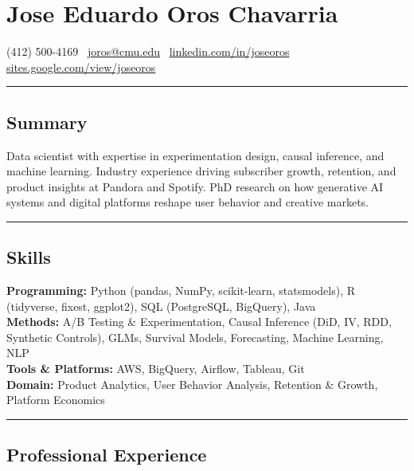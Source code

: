 \documentclass[10pt,letterpaper]{article}
\newcommand{\name}[1]{\section*{#1}}
\newcommand{\sep}{{\color{gray}\,\textbullet\,\,}}
\newcommand{\hsep}{\noindent\textcolor{gray}{\rule{\textwidth}{0.5pt}}}
\newcommand{\block}[1]{\begin{samepage}\hsep\subsection*{#1}\end{samepage}}
\begin{document}
\name{Jose Eduardo Oros Chavarria}

\begin{center}
(412) 500-4169 \sep \href{mailto:joros@cmu.edu}{joros@cmu.edu} \sep \href{https://www.linkedin.com/in/joseoros}{linkedin.com/in/joseoros} \sep \href{https://sites.google.com/view/joseoros}{sites.google.com/view/joseoros}
\end{center}

\block{Summary}

\noindent Data scientist with expertise in experimentation design, causal inference, and machine learning. Industry experience driving subscriber growth, retention, and product insights at Pandora and Spotify. PhD research on how generative AI systems and digital platforms reshape user behavior and creative markets.

\block{Skills}

\noindent\textbf{Programming:} Python (pandas, NumPy, scikit-learn, statsmodels), R (tidyverse, fixest, ggplot2), SQL (PostgreSQL, BigQuery), Java \\
\textbf{Methods:} A/B Testing \& Experimentation, Causal Inference (DiD, IV, RDD, Synthetic Controls), GLMs, Survival Models, Forecasting, Machine Learning, NLP \\
\textbf{Tools \& Platforms:} AWS, BigQuery, Airflow, Tableau, Git \\
\textbf{Domain:} Product Analytics, User Behavior Analysis, Retention \& Growth, Platform Economics

\block{Professional Experience}
\end{document}
